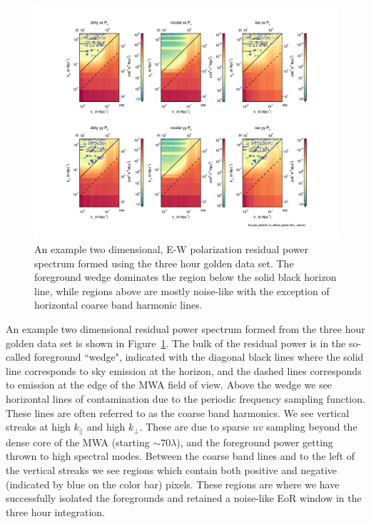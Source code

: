 \documentclass[iop]{emulateapj}
\begin{document}
\begin{figure}
\begin{center}
\includegraphics[width=.9\columnwidth]{example_ps.pdf}
\caption{
An example two dimensional, E-W polarization residual power spectrum formed using the 
three hour golden data set. The foreground wedge dominates the region below the solid 
black horizon line, while regions above are mostly noise-like with the exception of horizontal 
coarse band harmonic lines. 
\label{fig:example_ps}
}
\end{center}
\end{figure}

An example two dimensional residual power spectrum formed from the three hour golden 
data set is shown in Figure~\ref{fig:example_ps}. The bulk of the residual power is in the 
so-called foreground ``wedge", indicated with the diagonal black lines where the solid line 
corresponds to sky emission at the horizon, and the dashed lines corresponds to emission 
at the edge of the MWA field of view. Above the wedge we see horizontal lines of 
contamination due to the periodic frequency sampling function. These lines are often 
referred to as the coarse band harmonics. We see vertical streaks at high $k_{||}$ and high 
$k_{\perp}$. These are due to sparse $uv$ sampling beyond the dense core of the MWA 
(starting $\sim70\lambda$), and the foreground power getting thrown to high spectral 
modes. Between the coarse band lines and to the left of the vertical streaks we see regions 
which contain both positive and negative (indicated by blue on the color bar) pixels. These 
regions are where we have successfully isolated the foregrounds and retained a noise-like 
EoR window in the three hour integration.
\end{document}
